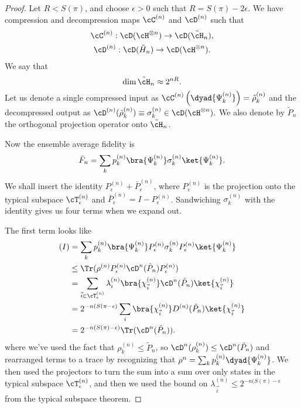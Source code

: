 \begin{proof}
    Let $R<S(\pi)$, and choose $\epsilon >0$ such that $R=S(\pi)-2\epsilon$. We have compression and decompression maps $\cC^{(n)}$ and $\cD^{(n)}$
    such that
    \begin{gather}
        \cC^{(n)}: \cD(\cH^{\otimes n})\to \cD(\tilde \cH_n),\\
        \cD^{(n)}: \cD(\tilde H_n) \to \cD(\cH^{\otimes n}).
    \end{gather}
    We say that
    \begin{equation}
        \dim \tilde \cH_n \approx 2^{nR}.
    \end{equation}
    Let us denote a single compressed input as $\cC^{(n)}\left(\dyad{\Psi_k^{(n)}}\right)=\tilde \rho_k^{(n)}$ and the decompressed output as $\cD^{(n)}(\tilde \rho_k^{(n)}) \equiv \sigma_k^{(n)} \in \cD(\cH^{\otimes n}).$
    We also denote by $\tilde P_n$ the orthogonal projection operator onto $\tilde \cH_n$.
    
    Now the ensemble average fidelity is
    \begin{equation}
        \bar F_n =\sum_k p_k^{(n)} \bra{\Psi_k^{(n)}}\sigma_k^{(n)} \ket{\Psi_k^{(n)}}.
    \end{equation}
    We shall insert the identity $P_\epsilon^{(n)}+\bar P_\epsilon^{(n)}$, where $P_\epsilon^{(n)}$ is the projection onto the typical subspace $\cT_\epsilon^{(n)}$ and $\bar P_\epsilon^{(n)}=I-P_\epsilon^{(n)}$. Sandwiching $\sigma_k^{(n)}$ with the identity gives us four terms when we expand out.
    
    The first term looks like
    \begin{align*}
        (I) &= \sum_k p_k^{(n)} \bra{\Psi_k^{(n)}}P_\epsilon^{(n)} \sigma_k^{(n)} P_\epsilon^{(n)} \ket{\Psi_k^{(n)}}\\
            &\leq\Tr(\rho^{(n)} P_\epsilon^{(n)} \cD^{n}(\tilde P_n) P_\epsilon^{(n)})\\
            &= \sum_{\vec i \in \cT_{\epsilon}^{(n)}} \lambda_i^{(n)} \bra{\chi_{\vec i}^{(n)}} \cD^{n}(\tilde P_n) \ket{\chi_{\vec i}^{(n)}}\\
            &= 2^{-n(S(\pi-\epsilon)} \sum_i \bra{\chi_{\vec i}^{(n)}}D^{(n)}(\tilde P_n)\ket{\chi_{\vec i}^{(n)}}\\
            &= 2^{-n(S(\pi)-\epsilon)} \Tr(\cD^n(\tilde P_n)).
    \end{align*}
    where we've used the fact that $\rho_k^{(n)} \leq \tilde P_n$, so $\cD^n(\rho_k^{(n)})\leq \cD^n(\tilde P_n)$ and rearranged terms to a trace by recognizing that $\rho^n=\sum_k p_k^{(n)} \dyad{\Psi_k^{(n)}}$. We then used the projectors to turn the sum into a sum over only states in the typical subspace $\cT_\epsilon^{(n)}$, and then we used the bound on $\lambda_{\vec i}^{(n)}\leq 2^{-n(S(\pi)-\epsilon}$ from the typical subspace theorem.
    

\end{proof}
